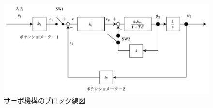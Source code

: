 \begin{figure}
	\centering
	\includegraphics[width=0.8\linewidth]{src/figures/servo-block-line-detail/servo-block-line-detail.png}
	\caption{サーボ機構のブロック線図}\label{fig:servo-block-line-detail}
\end{figure}
